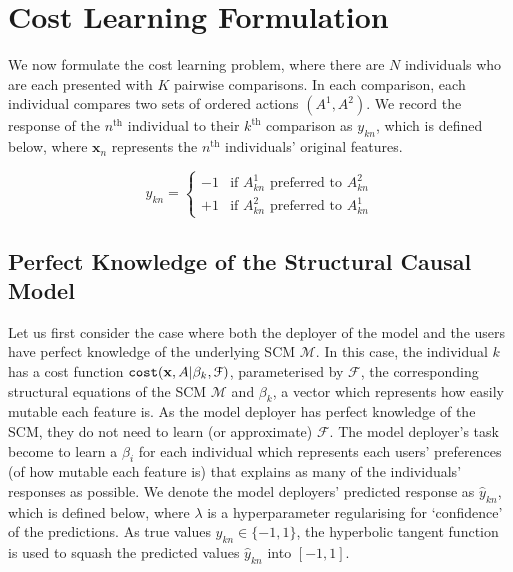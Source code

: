 \section{Cost Learning Formulation} \label{section:cost_learning_formulation}

We now formulate the cost learning problem, where there are $N$ individuals who are each presented with $K$ pairwise comparisons. In each comparison, each individual compares two sets of ordered actions $(A^1, A^2)$. We record the response of the $n^{\text{th}}$ individual to their $k^{\text{th}}$ comparison as $y_{kn}$, which is defined below, where $\mathbf{x}_n$ represents the $n^{\text{th}}$ individuals' original features.



\begin{equation} \label{eq:paired_response}
	y_{kn} = \begin{cases}
		-1 & \text{if } A^1_{kn} \text{ preferred to } A^2_{kn} \\
		+1 & \text{if } A^2_{kn} \text{ preferred to } A^1_{kn}
	\end{cases}
\end{equation}



\subsection{Perfect Knowledge of the Structural Causal Model}

Let us first consider the case where both the deployer of the model and the users have perfect knowledge of the underlying SCM $\mathcal{M}$. In this case, the individual $k$ has a cost function $\operatorname*{\texttt{cost}}(\mathbf{x}, A|\beta_k, \mathcal{F})$, parameterised by $\mathcal{F}$, the corresponding structural equations of the SCM $\mathcal{M}$ and $\beta_k$, a vector which represents how easily mutable each feature is. As the model deployer has perfect knowledge of the SCM, they do not need to learn (or approximate) $\mathcal{F}$. The model deployer's task become to learn a $\beta_i$ for each individual which represents each users' preferences (of how mutable each feature is) that explains as many of the individuals' responses as possible. We denote the model deployers' predicted response as $\hat{y}_{kn}$, which is defined below, where $\lambda$ is a hyperparameter regularising for `confidence' of the predictions. As true values $y_{kn} \in \{-1,1\}$, the hyperbolic tangent function is used to squash the predicted values $\hat{y}_{kn}$ into $[-1,1]$.

